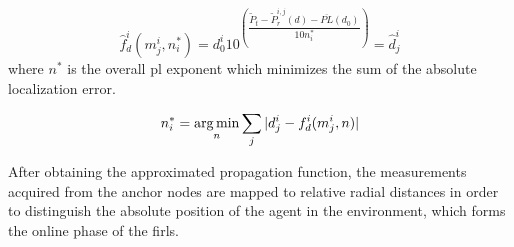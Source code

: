     \begin{equation}
      \label{eq:log-distance-d-app}
      \hat{f}^i_d(m^i_j, n_i^*) = d^i_0 10^{\left(\dfrac{\widetilde{P}_t - \widetilde{P}_r^{i,j}(d) - \overline{PL}(d_0)}{10 n_i^*} \right)} = \hat{d}^i_j
    \end{equation}
    where $n^*$ is the overall \gls{pl} exponent which minimizes the sum of the absolute localization error.

    \begin{equation}
      n^*_i = \operatorname*{arg\,min}_n \sum_j |d^i_j - f^i_d(m^i_j, n)|
    \end{equation}

    After obtaining the approximated propagation function, the measurements acquired from the anchor nodes are mapped to relative radial distances in order to distinguish the absolute position of the agent in the environment, which forms the online phase of the \gls{firl}s.
